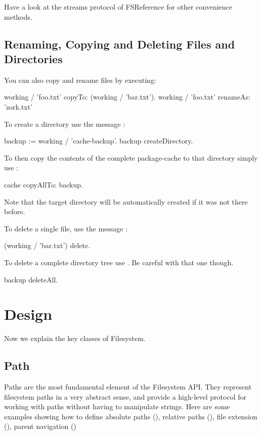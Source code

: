 \documentclass[a4paper,10pt,twoside]{book}
\begin{document}
Have a look at the streams protocol of FSReference for other convenience methods.

\subsection{Renaming, Copying and Deleting Files and Directories}

You can also copy and rename files by executing:

\begin{code}{}
working / 'foo.txt' copyTo: (working / 'bar.txt').
working / 'foo.txt' renameAs: 'zork.txt'
\end{code} 


To create a directory use the message :

\begin{code}{}
backup := working / 'cache-backup'.
backup createDirectory.
\end{code} 

To then copy the contents of the complete package-cache to that directory simply use :

\begin{code}{}
 cache copyAllTo: backup.
\end{code}

Note that the target directory will be automatically created if it was not there before.



To delete a single file, use the message :
\begin{code}{}
 (working / 'bar.txt') delete.
\end{code}

To delete a complete directory tree use . Be careful with that one though.

\begin{code}
backup deleteAll.
\end{code}


\section{Design }

Now we explain the key classes of Filesystem. 


\subsection{Path}
Paths are the most fundamental element of the Filesystem API. They represent filesystem paths in a very abstract sense, and provide a high-level protocol for working with paths without having to manipulate strings. Here are some examples showing how to 
define absolute paths (), relative paths (), file extension (), parent navigation ()
\end{document}
